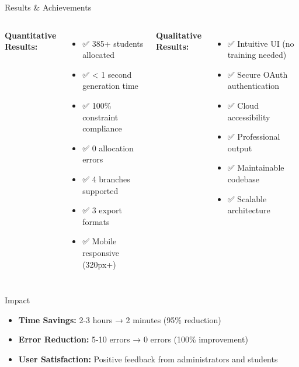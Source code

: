 \documentclass[aspectratio=169]{beamer}
\begin{document}
\begin{frame}{Results \& Achievements}
\begin{columns}
\textbf{Quantitative Results:}
\begin{itemize}
    \item ✅ 385+ students allocated
    \item ✅ < 1 second generation time
    \item ✅ 100\% constraint compliance
    \item ✅ 0 allocation errors
    \item ✅ 4 branches supported
    \item ✅ 3 export formats
    \item ✅ Mobile responsive (320px+)
\end{itemize}

\textbf{Qualitative Results:}
\begin{itemize}
    \item ✅ Intuitive UI (no training needed)
    \item ✅ Secure OAuth authentication
    \item ✅ Cloud accessibility
    \item ✅ Professional output
    \item ✅ Maintainable codebase
    \item ✅ Scalable architecture
\end{itemize}
\end{columns}

\vspace{0.5cm}
\begin{block}{Impact}
\begin{itemize}
    \item \textbf{Time Savings:} 2-3 hours → 2 minutes (95\% reduction)
    \item \textbf{Error Reduction:} 5-10 errors → 0 errors (100\% improvement)
    \item \textbf{User Satisfaction:} Positive feedback from administrators and students
\end{itemize}
\end{block}
\end{frame}
\end{document}
